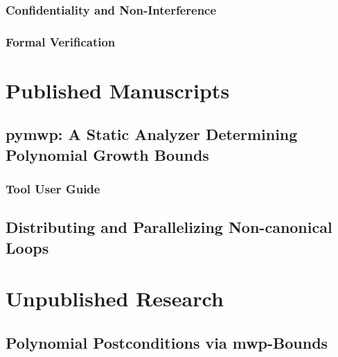         \subsection{Confidentiality and Non-Interference}
        \label{pl-sec}
        

        \subsection{Formal Verification}
        \label{verification}
        

\chapter{Published Manuscripts}\label{published-manuscripts}
\clearpage

    \section{pymwp: A Static Analyzer Determining Polynomial Growth Bounds}
    \label{sec:atva}
    
    \clearpage

    \subsection{Tool User Guide}
    \label{app:toolguide}
    
    \clearpage

    \section{Distributing and Parallelizing Non-canonical Loops}
    \label{sec:vmcai}
    
    \clearpage

\chapter{Unpublished Research}\label{ch:unpublished-research}
\clearpage

    \section{Polynomial Postconditions via mwp-Bounds}\label{sec:postcond}
    
    \clearpage


